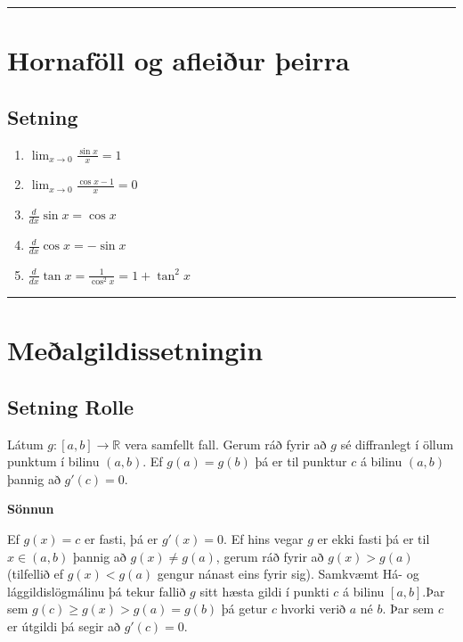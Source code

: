 \documentclass[b5paper,11pt,icelandic]{sphinxmanual}
\begin{document}
\bigskip\hrule{}\bigskip



\section{Hornaföll og afleiður þeirra}
\label{kafli03:hornafoll-og-afleiur-eirra}

\subsection{Setning}
\label{kafli03:id12}\begin{enumerate}
\item {} 
\(\displaystyle\lim_{x\rightarrow 0}\frac{\sin x}{x}=1\)

\item {} 
\(\displaystyle\lim_{x\rightarrow 0}\frac{\cos x-1}{x}=0\)

\item {} 
\(\displaystyle\frac{d}{dx}\sin x=\cos x\)

\item {} 
\(\displaystyle\frac{d}{dx}\cos x=-\sin x\)

\item {} 
\(\displaystyle\frac{d}{dx}\tan x=\frac{1}{\cos^2 x}=1+\tan^2 x\)

\end{enumerate}


\bigskip\hrule{}\bigskip



\section{Meðalgildissetningin}
\label{kafli03:mealgildissetningin}

\subsection{Setning Rolle}
\label{kafli03:rolle}\label{kafli03:index-6}\label{kafli03:setning-rolle}
Látum \(g:[a,b]\rightarrow{{\mathbb  R}}\) vera samfellt fall. Gerum
ráð fyrir að \(g\) sé diffranlegt í öllum punktum í bilinu
\((a,b)\). Ef \(g(a)=g(b)\) þá er til punktur \(c\) á bilinu
\((a,b)\) þannig að \(g'(c)=0\).

\textbf{Sönnun}

Ef \(g(x)=c\) er fasti, þá er \(g'(x)=0\). Ef hins vegar
\(g\) er ekki fasti þá er til \(x \in (a,b)\) þannig að
\(g(x)\neq g(a)\), gerum ráð fyrir að \(g(x)>g(a)\)
(tilfellið ef \(g(x)<g(a)\) gengur nánast eins fyrir sig).
Samkvæmt Há- og lággildislögmálinu
þá tekur fallið \(g\) sitt hæsta
gildi í punkti \(c\) á bilinu \([a,b]\).Þar sem
\(g(c)\geq g(x) >  g(a) = g(b)\) þá getur \(c\) hvorki verið
\(a\) né \(b\).
Þar sem \(c\)
er útgildi þá segir {\hyperref[kafli03:setning\string-3\string-5\string-2]{}} að \(g'(c)=0\).
\end{document}
